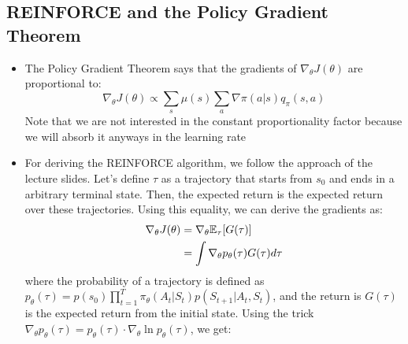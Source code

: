 \subsection{REINFORCE and the Policy Gradient Theorem}
\begin{itemize}
	\item The Policy Gradient Theorem says that the gradients of $\nabla_{\theta}J(\theta)$ are proportional to:
	$$\nabla_{\theta}J(\theta) \propto \sum_s \mu(s) \sum_a \nabla \pi(a|s)q_{\pi}(s,a) $$
	Note that we are not interested in the constant proportionality factor because we will absorb it anyways in the learning rate
	\item For deriving the REINFORCE algorithm, we follow the approach of the lecture slides. Let's define $\tau$ as a trajectory that starts from $s_0$ and ends in a arbitrary terminal state. Then, the expected return is the expected return over these trajectories. Using this equality, we can derive the gradients as:
	\begin{equation*}
		\begin{split}
			\nabla_{\theta}J(\theta) & =  \nabla_{\theta} \mathbb{E}_{\tau}[G(\tau)]\\
			& = \int \nabla_{\theta} p_{\theta}(\tau) G(\tau)d\tau\\
		\end{split}
	\end{equation*}
	where the probability of a trajectory is defined as $p_{\theta}(\tau)=p(s_0)\prod_{t=1}^{T}\pi_{\theta}(A_t|S_t)p(S_{t+1}|A_{t},S_t)$, and the return is $G(\tau)$ is the expected return from the initial state. Using the trick $\nabla_{\theta} p_{\theta}(\tau)=p_{\theta}(\tau)\cdot \nabla_{\theta} \ln p_{\theta}(\tau)$, we get:
	

\end{itemize}

